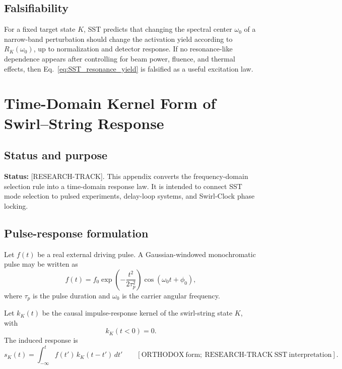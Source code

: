     \subsection*{Falsifiability}
        
        For a fixed target state \(K\), SST predicts that changing the spectral center \(\omega_0\) of a narrow-band perturbation should change the activation yield according to \(R_K(\omega_0)\), up to normalization and detector response. If no resonance-like dependence appears after controlling for beam power, fluence, and thermal effects, then Eq.~\eqref{eq:SST_resonance_yield} is falsified as a useful excitation law.

\section{Time-Domain Kernel Form of Swirl--String Response}
    \label{app:time-domain-kernel-response}
    
    \subsection*{Status and purpose}
        
        \noindent
        \textbf{Status:} [RESEARCH-TRACK].
        This appendix converts the frequency-domain selection rule into a time-domain response law. It is intended to connect SST mode selection to pulsed experiments, delay-loop systems, and Swirl-Clock phase locking.
    
    \subsection*{Pulse-response formulation}
        
        Let \(f(t)\) be a real external driving pulse. A Gaussian-windowed monochromatic pulse may be written as
        \begin{equation}
            f(t)
            =
            f_0
            \exp\!\left(-\frac{t^2}{2\tau_p^2}\right)
            \cos(\omega_0 t+\phi_0),
            \label{eq:gaussian_drive_pulse}
        \end{equation}
        where \(\tau_p\) is the pulse duration and \(\omega_0\) is the carrier angular frequency.
        
        Let \(k_K(t)\) be the causal impulse-response kernel of the swirl-string state \(K\), with
        \begin{equation}
            k_K(t<0)=0.
        \end{equation}
        The induced response is
        \begin{equation}
            \boxed{
                s_K(t)
                =
                \int_{-\infty}^{t}
                f(t')\,k_K(t-t')\,dt'
            }
            \qquad
            [\mathrm{ORTHODOX\ form;\ RESEARCH\text{-}TRACK\ SST\ interpretation}].
            \label{eq:SST_convolution_response}
        \end{equation}
    
